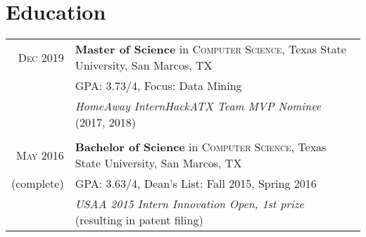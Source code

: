\documentclass[a4paper,10pt]{article}
\begin{document}
	\section{Education}
	\begin{tabular}{rl}	
		\textsc{Dec} 2019 & \textbf{Master of Science} in \textsc{Computer Science}, Texas State University, San Marcos, TX\\
		
		&\normalsize \textsc{GPA}: 3.73/4, Focus: Data Mining \\ 
		
		& \emph{HomeAway InternHackATX Team MVP Nominee} (2017, 2018) \\
		
		& \\
		
		\textsc{May} 2016 & \textbf{Bachelor of Science} in \textsc{Computer Science}, Texas State University, San Marcos, TX \\
		
		(complete) &\normalsize \textsc{GPA}: 3.63/4,  Dean's List: Fall 2015, Spring 2016 \\
		
		& \emph{USAA 2015 Intern Innovation Open, 1st prize} (resulting in patent filing)  \\
		
	\end{tabular}
\end{document}
